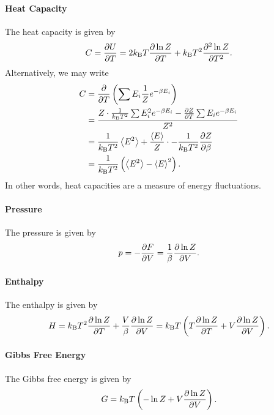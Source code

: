 \paragraph{Heat Capacity}
The heat capacity is given by
\begin{align*}
	C = \pdv{U}{T} = 2k_{\text{B}} T\pdv{\ln{Z}}{T} + k_{\text{B}} T^{2}\pdv[2]{\ln{Z}}{T}.
\end{align*}
Alternatively, we may write
\begin{align*}
	C &= \pdv{T}\left(\sum E_{i}\frac{1}{Z}e^{-\beta E_{i}}\right) \\
	  &= \frac{Z\cdot\frac{1}{k_{\text{B}} T^{2}}\sum E_{i}^{2}e^{-\beta E_{i}} - \pdv{Z}{T}\sum E_{i}e^{-\beta E_{i}}}{Z^{2}} \\
	  &= \frac{1}{k_{\text{B}} T^{2}}\expval{E^{2}} + \frac{\expval{E}}{Z}\cdot -\frac{1}{k_{\text{B}} T^{2}}\pdv{Z}{\beta} \\
	  &= \frac{1}{k_{\text{B}} T^{2}}\left(\expval{E^{2}} - \expval{E}^{2}\right).
\end{align*}
In other words, heat capacities are a measure of energy fluctuations.

\paragraph{Pressure}
The pressure is given by
\begin{align*}
	p = -\pdv{F}{V} = \frac{1}{\beta}\pdv{\ln{Z}}{V}.
\end{align*}

\paragraph{Enthalpy}
The enthalpy is given by
\begin{align*}
	H = k_{\text{B}} T^{2}\pdv{\ln{Z}}{T} + \frac{V}{\beta}\pdv{\ln{Z}}{V} = k_{\text{B}} T\left(T\pdv{\ln{Z}}{T} + V\pdv{\ln{Z}}{V}\right).
\end{align*}

\paragraph{Gibbs Free Energy}
The Gibbs free energy is given by
\begin{align*}
	G = k_{\text{B}} T\left(-\ln{Z} + V\pdv{\ln{Z}}{V}\right).
\end{align*}

